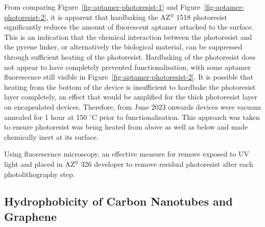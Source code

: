 \documentclass[
  a4paper,
]{scrbook}
\begin{document}
From comparing Figure~\ref{fig-aptamer-photoresist-1} and
Figure~\ref{fig-aptamer-photoresist-2}, it is apparent that hardbaking
the AZ\(^\circledR\) 1518 photoresist significantly reduces the amount
of fluorescent aptamer attached to the surface. This is an indication
that the chemical interaction between the photoresist and the pyrene
linker, or alternatively the biological material, can be suppressed
through sufficient heating of the photoresist. Hardbaking of the
photoresist does not appear to have completely prevented
functionalisation, with some aptamer fluorescence still visible in
Figure~\ref{fig-aptamer-photoresist-2}. It is possible that heating from
the bottom of the device is insufficient to hardbake the photoresist
layer completely, an effect that would be amplified for the thick
photoresist layer on encapsulated devices. Therefore, from June 2023
onwards devices were vacuum annealed for 1 hour at 150 \(^\circ\)C prior
to functionalisation. This approach was taken to ensure photoresist was
being heated from above as well as below and made chemically inert at
its surface.

Using fluorescence microscopy, an effective measure for remove exposed
to UV light and placed in AZ\(^\circledR\) 326 developer to remove
residual photoresist after each photolithography step.

\hypertarget{sec-hydrophobicity}{%
\subsection{Hydrophobicity of Carbon Nanotubes and
Graphene}\label{sec-hydrophobicity}}
\end{document}
